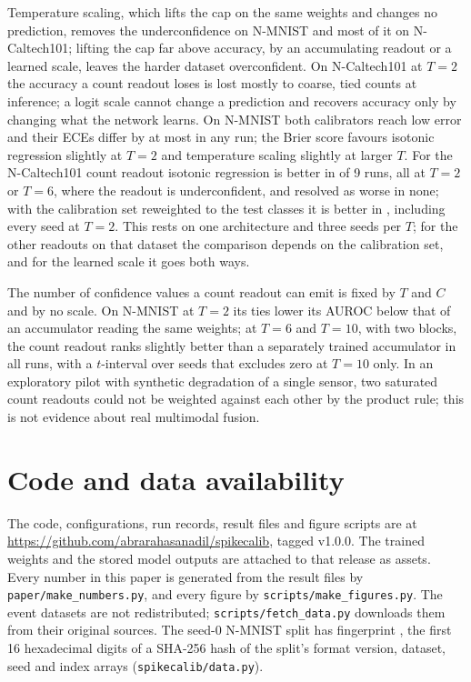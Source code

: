 \documentclass[10pt]{article}
\begin{document}
Temperature scaling, which lifts the cap on the same weights and changes no prediction, removes
the underconfidence on N-MNIST and most of it on N-Caltech101; lifting the cap far above accuracy,
by an accumulating readout or a learned scale, leaves the harder dataset overconfident. On
N-Caltech101 at $T=2$ the accuracy a count readout loses is lost mostly to coarse, tied counts at
inference; a logit scale cannot change a prediction and recovers accuracy only by changing what
the network learns. On N-MNIST both calibrators reach low error and their ECEs differ by at most %
\nmAbsDiffMax{} in any run; the Brier score favours isotonic regression slightly at $T=2$ and
temperature scaling slightly at larger $T$. For the N-Caltech101 count readout isotonic regression
is better in \ncDiffer{} of 9 runs, all at $T=2$ or $T=6$, where the readout is underconfident, %
and resolved as worse in none; with the calibration set reweighted to the test classes it is %
better in \rwCountIso, including every seed at $T=2$. This rests on one architecture and three
seeds per $T$; for the other readouts on that dataset the comparison depends on the calibration
set, and for the learned scale it goes both ways.

The number of confidence values a count readout can emit is fixed by $T$ and $C$ and by no scale.
On N-MNIST at $T=2$ its ties lower its AUROC below that of an accumulator reading the same
weights; at $T=6$ and $T=10$, with two blocks, the count readout ranks slightly better than a
separately trained accumulator in all \aurocSeedsSixTen{} runs, with a $t$-interval over seeds %
that excludes zero at $T=10$ only. In an exploratory pilot with synthetic degradation of a single
sensor, two saturated count readouts could not be weighted against each other by the product
rule; this is not evidence about real multimodal fusion.

\section*{Code and data availability}
The code, configurations, run records, result files and figure scripts are at
\url{https://github.com/abrarahasanadil/spikecalib}, tagged v1.0.0. The trained weights and the
stored model outputs are attached to that release as assets. Every number in this paper is
generated from the result files by \texttt{paper/make\_numbers.py}, and every figure by
\texttt{scripts/make\_figures.py}. The event datasets are not redistributed;
\texttt{scripts/fetch\_data.py} downloads them from their original sources. The seed-0 N-MNIST
split has fingerprint \texttt{\splitFingerprint}, the first 16 hexadecimal digits of a SHA-256
hash of the split's format version, dataset, seed and index arrays (\texttt{spikecalib/data.py}). %
\end{document}
